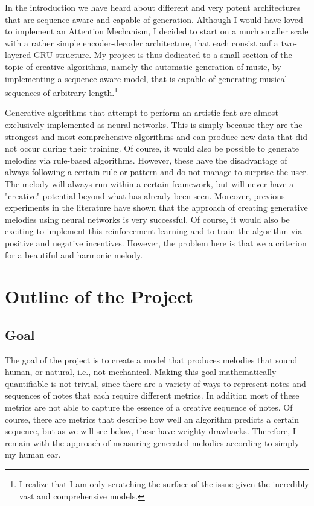 \documentclass[a4paper, 10pt, xcolor=dvipsnames]{article} %
\begin{document}
In the introduction we have heard about different and very potent architectures
that are sequence aware and capable of generation. Although I would have loved
to implement an Attention Mechanism, I decided to start on a much smaller scale
with a rather simple encoder-decoder architecture, that each consist auf a
two-layered GRU structure. My project is thus dedicated to a small section of
the topic of creative algorithms, namely the automatic generation of music, by
implementing a sequence aware model, that is capable of generating musical
sequences of arbitrary length.\footnote{I realize that I am only scratching the
  surface of the issue given the incredibly vast and comprehensive models.}

Generative algorithms that attempt to perform an artistic feat are almost
exclusively implemented as neural networks. This is simply because they are the
strongest and most comprehensive algorithms and can produce new data that did
not occur during their training. Of course, it would also be possible to
generate melodies via rule-based algorithms. However, these have the
disadvantage of always following a certain rule or pattern and do not manage to
surprise the user. The melody will always run within a certain framework, but
will never have a "creative" potential beyond what has already been seen.
Moreover, previous experiments in the literature have shown that the approach
of creating generative melodies using neural networks is very successful. Of
course, it would also be exciting to implement this reinforcement learning and
to train the algorithm via positive and negative incentives. However, the
problem here is that we a criterion for a beautiful and harmonic melody.

\section{Outline of the Project}
\subsection{Goal}
The goal of the project is to create a model that produces melodies that sound
human, or natural, i.e., not mechanical. Making this goal mathematically
quantifiable is not trivial, since there are a variety of ways to represent
notes and sequences of notes that each require different metrics. In addition
most of these metrics are not able to capture the essence of a creative
sequence of notes. Of course, there are metrics that describe how well an
algorithm predicts a certain sequence, but as we will see below, these have
weighty drawbacks. Therefore, I remain with the approach of measuring generated
melodies according to simply my human ear.
\end{document}
